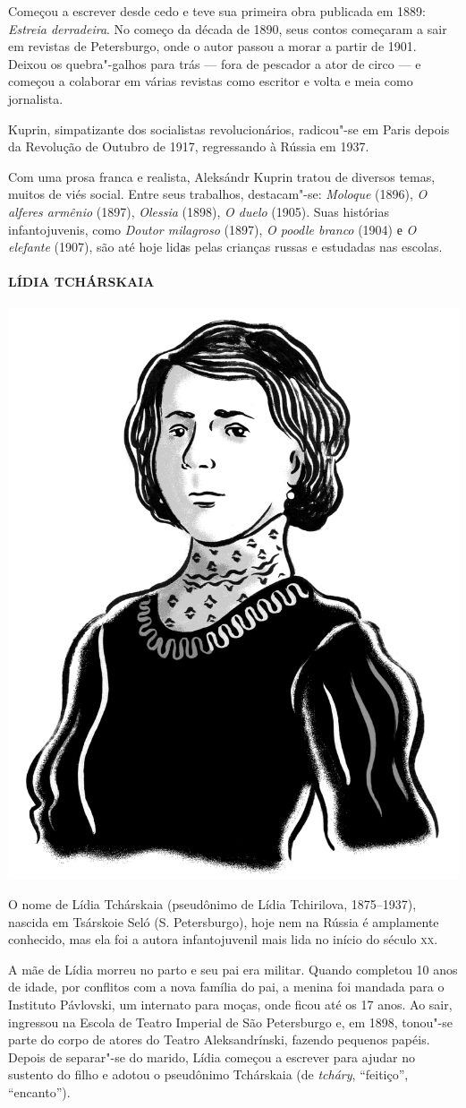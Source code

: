 Começou a escrever desde cedo e teve sua primeira obra publicada em
1889: \emph{Estreia derradeira}. No começo da década de 1890, seus
contos começaram a sair em revistas de Petersburgo, onde o autor passou
a morar a partir de 1901. Deixou os quebra"-galhos para trás --- fora de pescador
a ator de circo --- e começou a colaborar em várias revistas como
escritor e volta e meia como jornalista.

Kuprin, simpatizante dos socialistas revolucionários, radicou"-se em
Paris depois da Revolução de Outubro de 1917, regressando à Rússia em
1937.

Com uma prosa franca e realista, Aleksándr Kuprin tratou de diversos
temas, muitos de viés social. Entre seus trabalhos, destacam"-se:
\emph{Moloque} (1896), \emph{O alferes armênio} (1897), \emph{Olessia}
(1898), \emph{O duelo} (1905). Suas histórias infantojuvenis, como
\emph{Doutor milagroso} (1897), \emph{O poodle branco} (1904) е \emph{O
elefante} (1907), são até hoje lidаs pelas crianças russas e estudadas
nas escolas.

\paragraph{LÍDIA TCHÁRSKAIA}

\noindent\includegraphics[width=.8in]{./imgs/autor10.jpg}

\noindent{}O nome de Lídia Tchárskaia (pseudônimo de Lídia Tchirilova, 1875--1937),
nascida em Tsárskoie Seló (S. Petersburgo), hoje nem na Rússia é
amplamente conhecido, mas ela foi a autora infantojuvenil mais lida no
início do século \textsc{xx}.

A mãe de Lídia morreu no parto e seu pai era militar. Quando completou
10 anos de idade, por conflitos com a nova família do pai, a menina foi
mandada para o Instituto Pávlovski, um internato para moças, onde ficou
até os 17 anos. Ao sair, ingressou na Escola de Teatro Imperial de São
Petersburgo e, em 1898, tonou"-se parte do corpo de atores do Teatro
Aleksandrínski, fazendo pequenos papéis. Depois de separar"-se do marido,
Lídia começou a escrever para ajudar no sustento do filho e adotou o
pseudônimo Tchárskaia (de \emph{tcháry}, ``feitiço'', ``encanto'').

